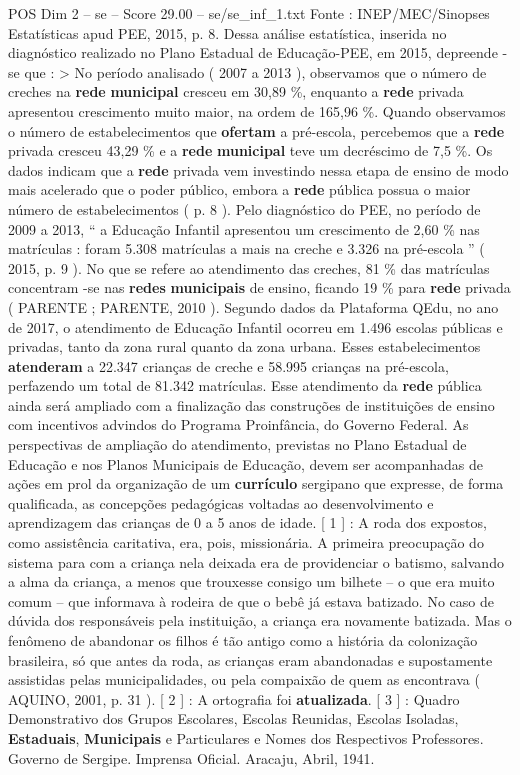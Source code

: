 \begin{textsample}{POS Dim 2 – se – Score 29.00 – se/se\_inf\_1.txt}
Fonte : INEP/MEC/Sinopses Estatísticas apud PEE, 2015, p. 8.
Dessa análise estatística, inserida no diagnóstico realizado no Plano Estadual de Educação-PEE, em 2015, depreende -se que : > No período analisado ( 2007 a 2013 ), observamos que o número de creches na \textbf{rede} \textbf{municipal} cresceu em 30,89 \%, enquanto a \textbf{rede} privada apresentou crescimento muito maior, na ordem de 165,96 \%.
Quando observamos o número de estabelecimentos que \textbf{ofertam} a pré-escola, percebemos que a \textbf{rede} privada cresceu 43,29 \% e a \textbf{rede} \textbf{municipal} teve um decréscimo de 7,5 \%.
Os dados indicam que a \textbf{rede} privada vem investindo nessa etapa de ensino de modo mais acelerado que o poder público, embora a \textbf{rede} pública possua o maior número de estabelecimentos ( p. 8 ).
Pelo diagnóstico do PEE, no período de 2009 a 2013, “ a Educação Infantil apresentou um crescimento de 2,60 \% nas matrículas : foram 5.308 matrículas a mais na creche e 3.326 na pré-escola ” ( 2015, p. 9 ).
No que se refere ao atendimento das creches, 81 \% das matrículas concentram -se nas \textbf{redes} \textbf{municipais} de ensino, ficando 19 \% para \textbf{rede} privada ( PARENTE ; PARENTE, 2010 ).
Segundo dados da Plataforma QEdu, no ano de 2017, o atendimento de Educação Infantil ocorreu em 1.496 escolas públicas e privadas, tanto da zona rural quanto da zona urbana.
Esses estabelecimentos \textbf{atenderam} a 22.347 crianças de creche e 58.995 crianças na pré-escola, perfazendo um total de 81.342 matrículas.
Esse atendimento da \textbf{rede} pública ainda será ampliado com a finalização das construções de instituições de ensino com incentivos advindos do Programa Proinfância, do Governo Federal.
As perspectivas de ampliação do atendimento, previstas no Plano Estadual de Educação e nos Planos Municipais de Educação, devem ser acompanhadas de ações em prol da organização de um \textbf{currículo} sergipano que expresse, de forma qualificada, as concepções pedagógicas voltadas ao desenvolvimento e aprendizagem das crianças de 0 a 5 anos de idade. [ 1 ] : A roda dos expostos, como assistência caritativa, era, pois, missionária.
A primeira preocupação do sistema para com a criança nela deixada era de providenciar o batismo, salvando a alma da criança, a menos que trouxesse consigo um bilhete – o que era muito comum – que informava à rodeira de que o bebê já estava batizado.
No caso de dúvida dos responsáveis pela instituição, a criança era novamente batizada.
Mas o fenômeno de abandonar os filhos é tão antigo como a história da colonização brasileira, só que antes da roda, as crianças eram abandonadas e supostamente assistidas pelas municipalidades, ou pela compaixão de quem as encontrava ( AQUINO, 2001, p. 31 ). [ 2 ] : A ortografia foi \textbf{atualizada}. [ 3 ] : Quadro Demonstrativo dos Grupos Escolares, Escolas Reunidas, Escolas Isoladas, \textbf{Estaduais}, \textbf{Municipais} e Particulares e Nomes dos Respectivos Professores.
Governo de Sergipe.
Imprensa Oficial.
Aracaju, Abril, 1941.


\end{textsample}
